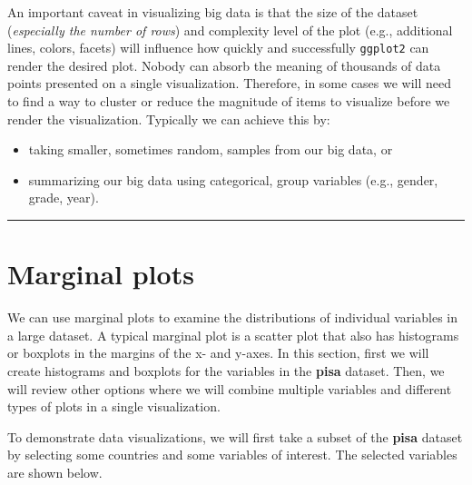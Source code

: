 \documentclass[]{book}
\providecommand{\tightlist}{%
  \setlength{\itemsep}{0pt}\setlength{\parskip}{0pt}}
\begin{document}
An important caveat in visualizing big data is that the size of the dataset (\emph{especially the number of rows}) and complexity level of the plot (e.g., additional lines, colors, facets) will influence how quickly and successfully \texttt{ggplot2} can render the desired plot. Nobody can absorb the meaning of thousands of data points presented on a single visualization. Therefore, in some cases we will need to find a way to cluster or reduce the magnitude of items to visualize before we render the visualization. Typically we can achieve this by:

\begin{itemize}
\tightlist
\item
  taking smaller, sometimes random, samples from our big data, or
\item
  summarizing our big data using categorical, group variables (e.g., gender, grade, year).
\end{itemize}

\begin{center}\rule{0.5\linewidth}{\linethickness}\end{center}

\hypertarget{marginal-plots}{%
\section{Marginal plots}\label{marginal-plots}}

We can use marginal plots to examine the distributions of individual variables in a large dataset. A typical marginal plot is a scatter plot that also has histograms or boxplots in the margins of the x- and y-axes. In this section, first we will create histograms and boxplots for the variables in the \textbf{pisa} dataset. Then, we will review other options where we will combine multiple variables and different types of plots in a single visualization.

To demonstrate data visualizations, we will first take a subset of the \textbf{pisa} dataset by selecting some countries and some variables of interest. The selected variables are shown below.
\end{document}
